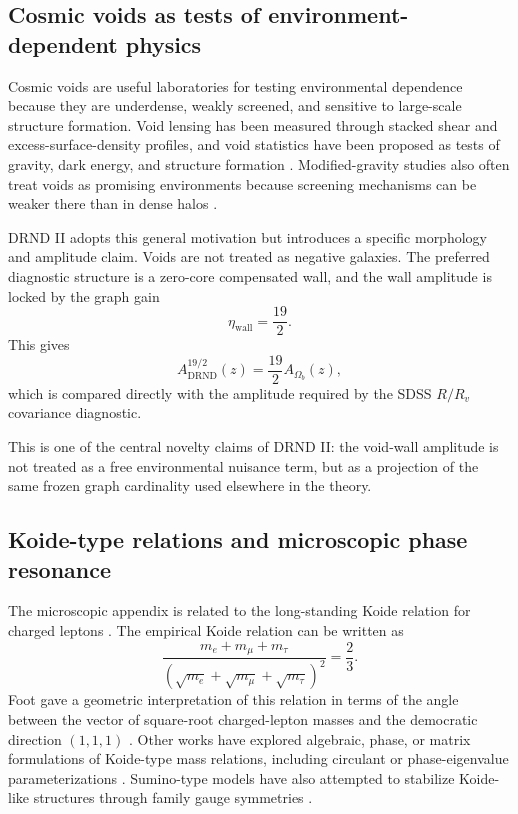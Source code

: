 \documentclass[12pt]{iopart}
\begin{document}
\subsection{Cosmic voids as tests of environment-dependent physics}

Cosmic voids are useful laboratories for testing environmental dependence because they are underdense, weakly screened, and sensitive to large-scale structure formation. Void lensing has been measured through stacked shear and excess-surface-density profiles, and void statistics have been proposed as tests of gravity, dark energy, and structure formation \cite{Clampitt2015,Hamaus2014,Cai2015}. Modified-gravity studies also often treat voids as promising environments because screening mechanisms can be weaker there than in dense halos \cite{Zivick2015,Cai2015}.

DRND II adopts this general motivation but introduces a specific morphology and amplitude claim. Voids are not treated as negative galaxies. The preferred diagnostic structure is a zero-core compensated wall, and the wall amplitude is locked by the graph gain
\begin{equation}
\eta_{\mathrm{wall}}=\frac{19}{2}.
\end{equation}
This gives
\begin{equation}
A_{\mathrm{DRND}}^{19/2}(z)
=
\frac{19}{2}A_{\Omega_b}(z),
\end{equation}
which is compared directly with the amplitude required by the SDSS \(R/R_v\) covariance diagnostic.

This is one of the central novelty claims of DRND II: the void-wall amplitude is not treated as a free environmental nuisance term, but as a projection of the same frozen graph cardinality used elsewhere in the theory.

\subsection{Koide-type relations and microscopic phase resonance}

The microscopic appendix is related to the long-standing Koide relation for charged leptons \cite{Koide1981,Koide1982}. The empirical Koide relation can be written as
\begin{equation}
\frac{
m_e+m_\mu+m_\tau
}{
\left(\sqrt{m_e}+\sqrt{m_\mu}+\sqrt{m_\tau}\right)^2
}
=
\frac23.
\end{equation}
Foot gave a geometric interpretation of this relation in terms of the angle between the vector of square-root charged-lepton masses and the democratic direction \((1,1,1)\) \cite{Foot1994}. Other works have explored algebraic, phase, or matrix formulations of Koide-type mass relations, including circulant or phase-eigenvalue parameterizations \cite{Brannen2006,BrannenAPS2006}. Sumino-type models have also attempted to stabilize Koide-like structures through family gauge symmetries \cite{Sumino2009}.
\end{document}
